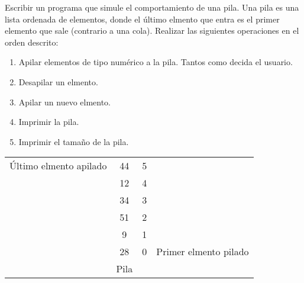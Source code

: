 
\question  Escribir un programa que simule el comportamiento de una pila.
           Una pila es una lista ordenada de elementos, donde el último
           elmento que entra es el primer elemento que sale (contrario a una
           cola). Realizar las siguientes operaciones en el orden descrito:

\begin{enumerate}
  \item Apilar elementos de tipo numérico a la pila. Tantos como decida el
        usuario.
  \item Desapilar un elmento.
  \item Apilar un nuevo elmento.
  \item Imprimir la pila.
  \item Imprimir el tamaño de la pila.
\end{enumerate}

\begin{center}
  \begin{tabular}{l|c|cr}
    Último elmento apilado  & 44 & 5 & \\
       & 12 & 4 & \\
       & 34 & 3 & \\
       & 51 & 2 & \\
       &  9 & 1 & \\
       & 28 & 0 & Primer elmento pilado\\
    \hline
       & Pila & &
  \end{tabular}
\end{center}
